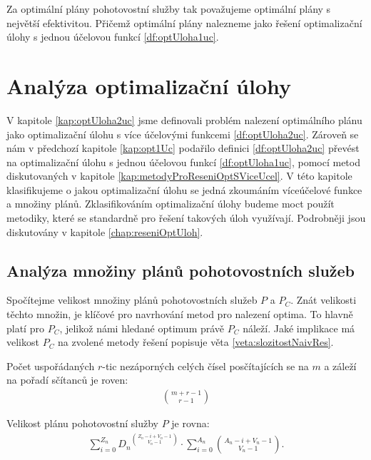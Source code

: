 Za optimální plány pohotovostní služby tak považujeme optimální plány s největší efektivitou.
Přičemž optimální plány nalezneme jako řešení optimalizační úlohy s jednou účelovou funkcí \ref{df:optUloha1uc}.

\section{Analýza optimalizační úlohy}

V kapitole \ref{kap:optUloha2uc} jsme definovali problém nalezení optimálního plánu jako optimalizační úlohu s více účelovými funkcemi \ref{df:optUloha2uc}.
Zároveň se nám v předchozí kapitole \ref{kap:opt1Uc} podařilo definici \ref{df:optUloha2uc} převést na optimalizační úlohu s jednou účelovou funkcí \ref{df:optUloha1uc},
pomocí metod diskutovaných v kapitole \ref{kap:metodyProReseniOptSViceUcel}.
V této kapitole klasifikujeme o jakou optimalizační úlohu se jedná zkoumáním víceúčelové funkce a množiny plánů.
Zklasifikováním optimalizační úlohy budeme moct použít metodiky, které se standardně pro řešení takových úloh využívají. 
Podrobněji jsou diskutovány v kapitole \ref{chap:reseniOptUloh}.

\subsection{Analýza množiny plánů pohotovostních služeb}\label{kap:analP}

Spočítejme velikost množiny plánů pohotovostních služeb $P$ a $P_C$.
Znát velikosti těchto množin, je klíčové pro navrhování metod pro nalezení optima.
To hlavně platí pro $P_C$, jelikož námi hledané optimum právě $P_C$ náleží.
Jaké implikace má velikost $P_C$ na zvolené metody řešení popisuje věta \ref{veta:slozitostNaivRes}.

\begin{lemma}\label{lemma:pocetRtic}
  Počet uspořádaných $r$-tic nezáporných celých čísel posčítajících se na $m$ a záleží na pořadí sčítanců je roven: 
  \begin{align*}
    \binom{m + r - 1}{r - 1}
  \end{align*}
\end{lemma}

\begin{veta}\label{veta:velikostP}
  Velikost plánu pohotovostní služby $P$ je rovna:
  \begin{align*}
    \sum_{i = 0}^{Z_n} {D_n}^{\binom{Z_n - i + V_n - 1}{V_n - 1}} \cdot \sum_{i = 0}^{A_n} {\binom{A_n - i + V_n - 1}{V_n - 1}}.
  \end{align*}
\end{veta}

